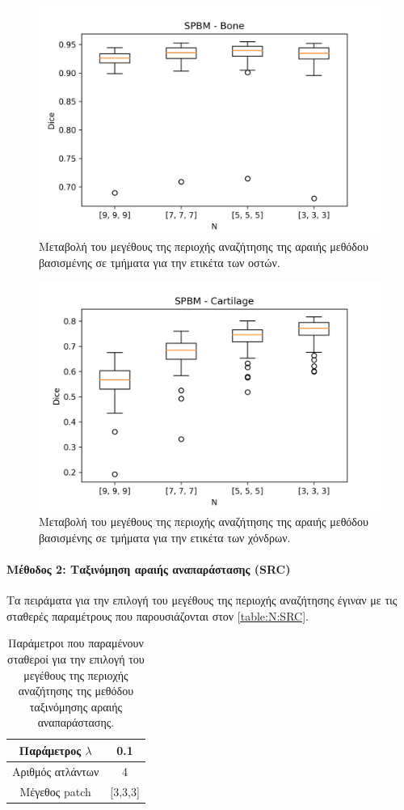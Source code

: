 \documentclass[a4paper,12pt]{article}
\newcommand{\paragraphLine}[1]{\paragraph{#1}\mbox{}}
\begin{document}
\begin{figure}[H]
    \centering
    \includegraphics[width=0.85\linewidth]{SPBM_N_Bone_plot.png}
    \caption{Μεταβολή του μεγέθους της περιοχής αναζήτησης της αραιής μεθόδου
             βασισμένης σε τμήματα για την ετικέτα των οστών.}
    \label{fig:SPBM:N:2}
\end{figure}

\begin{figure}[H]
    \centering
    \includegraphics[width=0.85\linewidth]{SPBM_N_Cartilage_plot.png}
    \caption{Μεταβολή του μεγέθους της περιοχής αναζήτησης της αραιής μεθόδου
             βασισμένης σε τμήματα για την ετικέτα των χόνδρων.}
    \label{fig:SPBM:N:3}
\end{figure}

\paragraphLine{Μέθοδος 2: Ταξινόμηση αραιής αναπαράστασης (SRC)}

Τα πειράματα για την επιλογή του μεγέθους της περιοχής αναζήτησης έγιναν με τις
σταθερές παραμέτρους που παρουσιάζονται στον \autoref{table:N:SRC}.

\begin{table}[h!]
    \centering
    \begin{tabular}{|c|c|} 
        \hline
        Παράμετρος $\lambda$ & 0.1 \\ 
        \hline
        Αριθμός ατλάντων & 4 \\ 
        \hline
        Μέγεθος patch & [3,3,3] \\ 
        \hline
    \end{tabular}
    \caption{Παράμετροι που παραμένουν σταθεροί για την επιλογή του μεγέθους της
             περιοχής αναζήτησης της μεθόδου ταξινόμησης αραιής αναπαράστασης.}
    \label{table:N:SRC}
\end{table}
\end{document}

